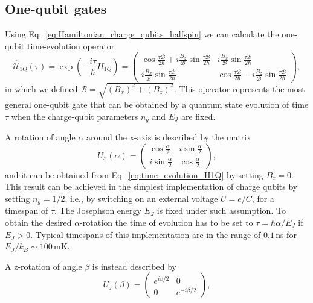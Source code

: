 \documentclass[../main/main.tex]{subfiles}
\begin{document}
\subsection{One-qubit gates} \label{sect:1Q_gates_implementation}
Using Eq.~\eqref{eq:Hamiltonian_charge_qubits_halfspin} we can calculate the one-qubit time-evolution operator 
\begin{equation} \label{eq:time_evolution_H1Q}
    \hat{\mathcal{U}}_{1Q}(\tau) = \exp{\left(-\frac{i \tau}{\hbar} \hat{H}_{1Q}\right)} = {\begin{pmatrix}
    \cos \frac{\tau \mathcal{B}}{2\hbar}+i\frac{B_z}{\mathcal{B}} \sin \frac{\tau \mathcal{B}}{2\hbar}
    & 
    i\frac{B_x}{\mathcal{B}} \sin \frac{\tau \mathcal{B}}{2\hbar}
    \\
    i\frac{B_x}{\mathcal{B}} \sin \frac{\tau \mathcal{B}}{2\hbar}
    &
    \cos \frac{\tau \mathcal{B}}{2\hbar}-i\frac{B_z}{\mathcal{B}} \sin \frac{\tau \mathcal{B}}{2\hbar}
    \end{pmatrix}},
\end{equation}
in which we defined $\mathcal{B} = \sqrt{(B_x)^2 + (B_z)^2}$. This operator represents the most general one-qubit gate that can be obtained by a quantum state evolution of time $\tau$ when the charge-qubit parameters $n_g$ and $E_J$ are fixed. \par
A rotation of angle $\alpha$ around the x-axis is described by the matrix
\begin{equation} \label{eq:alpha_x_axis_rotation}
    U_x(\alpha) = {\begin{pmatrix}
    \cos \frac{\alpha}{2} 
    &
    i \sin \frac{\alpha}{2}
    \\
    i \sin \frac{\alpha}{2}
    &
    \cos \frac{\alpha}{2} 
    \end{pmatrix}},
\end{equation}
and it can be obtained from Eq.~\eqref{eq:time_evolution_H1Q} by setting $B_z = 0$. This result can be achieved in the simplest implementation of charge qubits by setting $n_g = 1/2$, i.e., by switching on an external voltage $U=e/C$, for a timespan of $\tau$. The Josephson energy $E_J$ is fixed under such assumption. To obtain the desired $\alpha$-rotation the time of evolution has to be set to $\tau=\hbar \alpha / E_J$ if $E_J>0$. Typical timespans of this implementation are in the range of $0.1\,$ns for $E_J/k_B \sim 100\,$mK. \par
A z-rotation of angle $\beta$ is instead described by
\begin{equation} \label{eq:alpha_z_axis_rotation}
    U_z(\beta) = {\begin{pmatrix}
    e^{ i \beta/2 }
    &
    0
    \\
    0
    &
    e^{ -i \beta/2 }
    \end{pmatrix}},
\end{equation}
\end{document}
